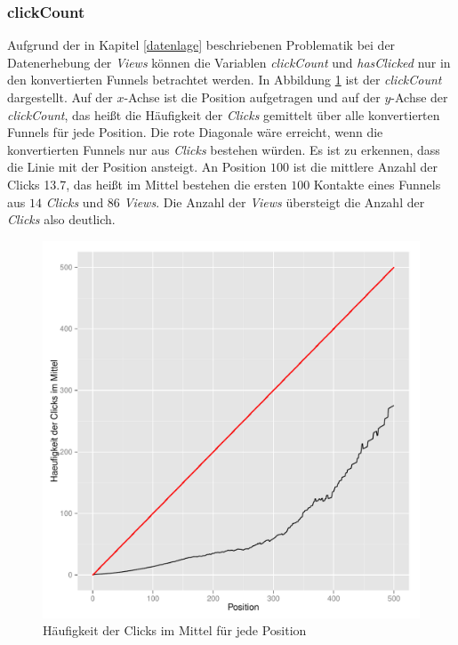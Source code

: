 \subsubsection*{clickCount}
Aufgrund der in Kapitel \ref{datenlage} beschriebenen Problematik bei der Datenerhebung der \textit{Views} können die Variablen \textit{clickCount} und \textit{hasClicked} nur in den konvertierten Funnels betrachtet werden. In Abbildung \ref{clickCount} ist der \textit{clickCount} dargestellt. Auf der $x$-Achse ist die Position aufgetragen und auf der $y$-Achse der \textit{clickCount}, das heißt die Häufigkeit der \textit{Clicks} gemittelt über alle konvertierten Funnels für jede Position. Die rote Diagonale wäre erreicht, wenn die konvertierten Funnels nur aus \textit{Clicks} bestehen würden. Es ist zu erkennen, dass die Linie mit der Position ansteigt. An Position $100$ ist die mittlere Anzahl der Clicks 13.7, das heißt im Mittel bestehen die ersten $100$ Kontakte eines Funnels aus $14$ \textit{Clicks} und $86$ \textit{Views}. Die Anzahl der \textit{Views} übersteigt die Anzahl der \textit{Clicks} also deutlich.
\begin{figure}[H]
    \centering
    \includegraphics[scale=0.5]{clickCountSucc.pdf}
    \caption{Häufigkeit der Clicks im Mittel für jede Position}
    \label{clickCount}
\end{figure}

